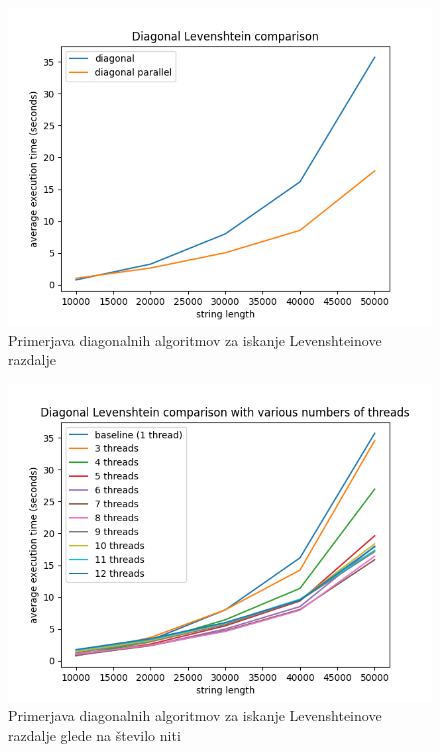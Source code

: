 \documentclass[a4paper,12pt,openright]{book}
\begin{document}
\begin{figure}[htb]
\begin{center}
\includegraphics[width=1.0\textwidth]{plots/Levenshtein_diagonal_comparison.png}
\end{center}
\caption{Primerjava diagonalnih algoritmov za iskanje Levenshteinove razdalje}
\label{comparison5}
\end{figure}


\begin{figure}[htb]
\begin{center}
\includegraphics[width=1.0\textwidth]{plots/Levenshtein_thread_number.png}
\end{center}
\caption{Primerjava diagonalnih algoritmov za iskanje Levenshteinove razdalje glede na število niti}
\label{comparison6}
\end{figure}
\end{document}

